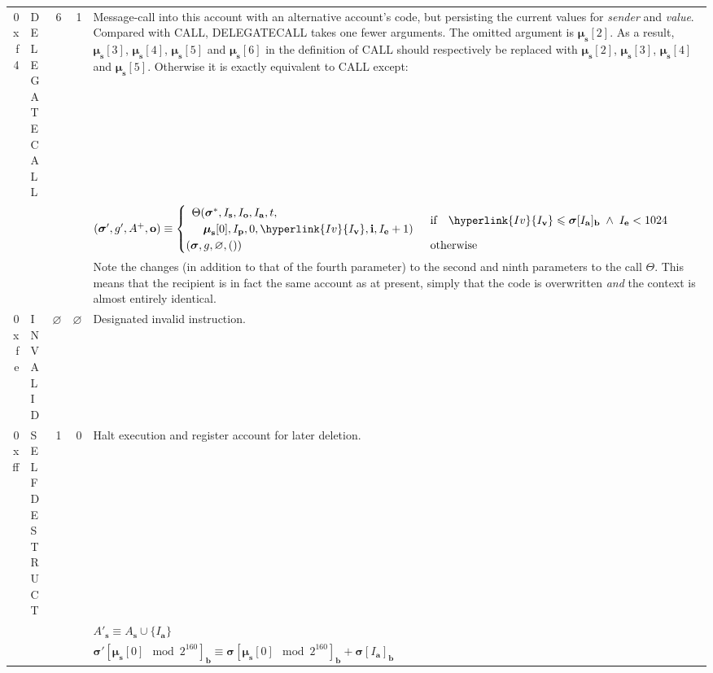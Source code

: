 \documentclass[9pt,oneside]{amsart}
\begin{document}
\begin{tabularx}{\textwidth}{rlrrX}
\midrule
0xf4 & {\small DELEGATECALL} & 6 & 1 & Message-call into this account with an alternative account's code, but persisting the current values for {\it sender} and {\it value}. Compared with {\small CALL}, {\small DELEGATECALL} takes one fewer arguments.  The omitted argument is $\boldsymbol{\mu}_\mathbf{s}[2]$. As a result, $\boldsymbol{\mu}_\mathbf{s}[3]$, $\boldsymbol{\mu}_\mathbf{s}[4]$, $\boldsymbol{\mu}_\mathbf{s}[5]$ and $\boldsymbol{\mu}_\mathbf{s}[6]$ in the definition of {\small CALL} should respectively be replaced with $\boldsymbol{\mu}_\mathbf{s}[2]$, $\boldsymbol{\mu}_\mathbf{s}[3]$, $\boldsymbol{\mu}_\mathbf{s}[4]$ and $\boldsymbol{\mu}_\mathbf{s}[5]$. Otherwise it is exactly equivalent to {\small CALL} except: \\
&&&& $(\boldsymbol{\sigma}', g', A^+, \mathbf{o}) \equiv \begin{cases}\begin{array}{l}\Theta(\boldsymbol{\sigma}^*, I_\mathbf{s}, I_\mathbf{o}, I_\mathbf{a}, t,\\\quad \boldsymbol{\mu}_\mathbf{s}[0], I_\mathbf{p}, 0, \hyperlink{I v}{I_\mathbf{v}}, \mathbf{i}, I_\mathbf{e} + 1)\end{array} & \text{if} \quad \hyperlink{I v}{I_\mathbf{v}} \leqslant \boldsymbol{\sigma}[I_\mathbf{a}]_\mathbf{b} \;\wedge\; I_\mathbf{e} < 1024 \\ (\boldsymbol{\sigma}, g, \varnothing, ()) & \text{otherwise} \end{cases}$ \\
&&&& Note the changes (in addition to that of the fourth parameter) to the second and ninth parameters to the call $\Theta$. This means that the recipient is in fact the same account as at present, simply that the code is overwritten {\it and} the context is almost entirely identical.\\
\midrule
0xfe & {\small INVALID} & $\varnothing$ & $\varnothing$ & Designated invalid instruction. \hypertarget{selfdestruct}{\\
\midrule
0xff & {\small SELFDESTRUCT} & 1 & 0 & Halt execution and register account for later deletion. }\\
&&&& $A'_\mathbf{s} \equiv A_\mathbf{s} \cup \{ I_\mathbf{a} \}$ \\
&&&& $\boldsymbol{\sigma}'[\boldsymbol{\mu}_\mathbf{s}[0] \mod 2^{160}]_\mathbf{b} \equiv \boldsymbol{\sigma}[\boldsymbol{\mu}_\mathbf{s}[0] \mod 2^{160}]_\mathbf{b} + \boldsymbol{\sigma}[I_\mathbf{a}]_\mathbf{b}$ \\

\end{tabularx}
\end{document}

